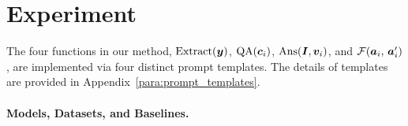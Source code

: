 \section{Experiment}
\label{sec:experiment}



The four functions in our method, $\text{Extract}({\bm{y}})$, $\text{QA}({\bm{c}}_i)$, $\text{Ans}({\bm{I}}, {\bm{v}}_i)$, and ${\mathcal{F}}({\bm{a}}_i,\, {\bm{a}}_i')$, are implemented via four distinct prompt templates. The details of templates are provided in Appendix~\ref{para:prompt_templates}.

\paragraph{Models, Datasets, and Baselines.}

